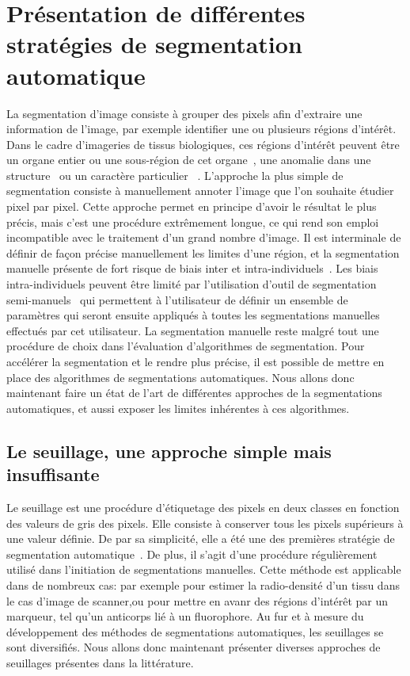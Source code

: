 \documentclass[\main/main.tex]{subfiles}
\begin{document}
            
\section{Présentation de différentes stratégies de segmentation automatique}

%
La segmentation d'image consiste à grouper des pixels afin d'extraire une information de l'image, par exemple identifier une ou plusieurs régions d'intérêt.
%
Dans le cadre d'imageries de tissus biologiques,
ces régions d'intérêt peuvent être un organe entier ou une sous\hyp{}région de cet organe~\cite{early_2018,liu_2020,gupta_2018},
une anomalie dans une structure~\cite{wadhwa_2019,huang_2019,ruikar_2019}
ou un caractère particulier~\cite{teixid_2019,hinfray_2018} .
%
L'approche la plus simple de segmentation consiste à manuellement annoter l'image que l'on souhaite étudier pixel par pixel.
%
Cette approche permet en principe d'avoir le résultat le plus précis,
mais c'est une procédure extrêmement longue, ce qui rend son emploi incompatible avec le traitement d'un grand nombre d'image.
%
Il est interminale de définir de façon précise manuellement les limites d'une région, et la segmentation manuelle présente de fort risque de biais inter et intra\hyp{}individuels~\cite{heye_2013}.
%
Les biais intra\hyp{}individuels peuvent être limité par l'utilisation d'outil de segmentation semi\hyp{}manuels~\cite{berg_2019,benenson_2019} qui permettent à l'utilisateur de définir un ensemble de paramètres qui seront ensuite appliqués à toutes les segmentations manuelles effectués par cet utilisateur.
%
La segmentation manuelle reste malgré tout une procédure de choix dans l'évaluation d'algorithmes de segmentation.
%
Pour accélérer la segmentation et le rendre plus précise, il est possible de mettre en place des algorithmes de segmentations automatiques.
%
Nous allons donc maintenant faire un état de l'art de différentes approches de la segmentations automatiques, et aussi exposer les limites inhérentes à ces algorithmes.

    \subsection{Le seuillage, une approche simple mais insuffisante}
    
%
Le seuillage est une procédure d'étiquetage des pixels en deux classes en fonction des valeurs de gris des pixels. Elle consiste à conserver tous les pixels supérieurs à une valeur définie. De par sa simplicité, elle a été une des premières stratégie de segmentation automatique~\cite{sakai_1969,otsu_1979}.
%
De plus, il s'agit d'une procédure régulièrement utilisé dans l'initiation de segmentations manuelles.
%
Cette méthode est applicable dans de nombreux cas: par exemple pour estimer la radio\hyp{}densité d'un tissu dans le cas d'image de scanner,ou pour mettre en avanr des régions d'intérêt par un marqueur, tel qu'un anticorps lié à un fluorophore.
%
Au fur et à mesure du développement des méthodes de segmentations automatiques, les seuillages se sont diversifiés.
Nous allons donc maintenant présenter diverses approches de seuillages présentes dans la littérature.
\end{document}
